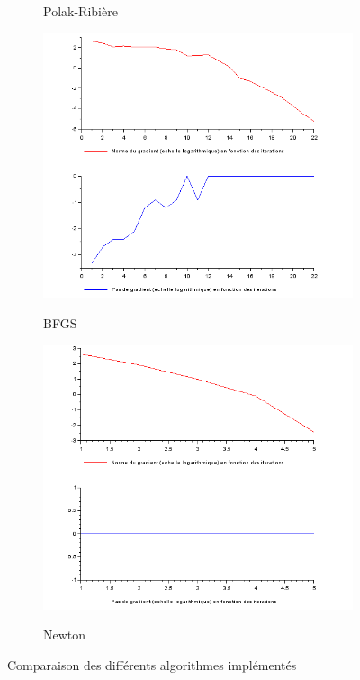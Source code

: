 \documentclass{article}
\begin{document}
\begin{figure}
\begin{subfigure}[t]{.4\textwidth}
            \label{fig:Polak_Ribiere}
            \caption{Polak-Ribière}
        \end{subfigure}
        \hfill
        \begin{subfigure}[t]{.4\textwidth}
            \includegraphics[width=\textwidth]{../Images/BFGS.png}
            \label{fig:BFGS}
            \caption{BFGS}
        \end{subfigure}
        \hfill
        \begin{subfigure}[t]{.4\textwidth}
            \includegraphics[width=\textwidth]{../Images/Newton.png}
            \label{fig:BFGS}
            \caption{Newton}
        \end{subfigure}
        \label{fig:courbes}
        \caption{Comparaison des différents algorithmes implémentés}
    \end{figure}
\end{document}
